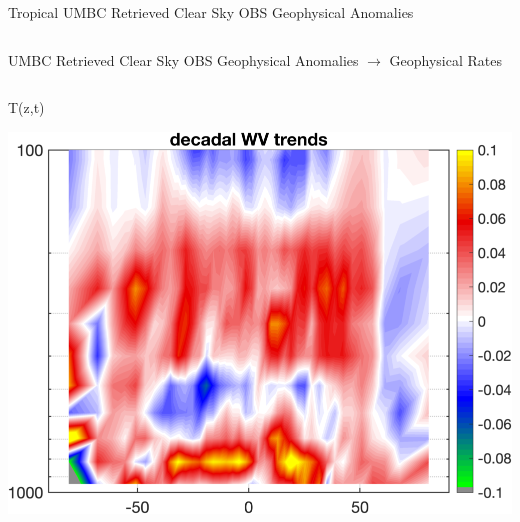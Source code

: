 \documentclass[10pt,t]{beamer}
\begin{document}
\begin{frame}{Tropical UMBC Retrieved Clear Sky OBS Geophysical Anomalies}
\begin{columns}
\begin{column}{0.45\columnwidth}

\end{column}
\end{columns}
\end{frame}


\begin{frame}{UMBC Retrieved Clear Sky OBS Geophysical Anomalies $\rightarrow$ Geophysical Rates}
\vspace{-0.35in}

\begin{columns}
\begin{column}{0.45\columnwidth}
\begin{block}{\footnotesize T(z,t)}
\vspace{-0.1in}
\begin{center}
\includegraphics[width=\linewidth]{Figs/ClearAnom/umbc_clr_retr_obs_ptemp_rate_200209_201808.png}
\end{center}
\end{block}
\end{column}


\end{columns}
\end{frame}
\end{document}
